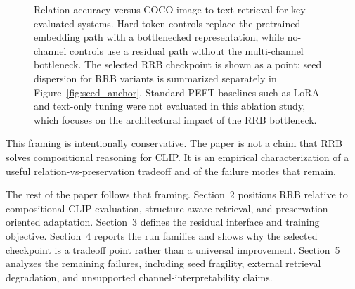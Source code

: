 \begin{figure}[t]
    \centering
    
    \caption{Relation accuracy versus COCO image-to-text retrieval for key evaluated systems. Hard-token controls replace the pretrained embedding path with a bottlenecked representation, while no-channel controls use a residual path without the multi-channel bottleneck. The selected RRB checkpoint is shown as a point; seed dispersion for RRB variants is summarized separately in Figure~\ref{fig:seed_anchor}. Standard PEFT baselines such as LoRA and text-only tuning were not evaluated in this ablation study, which focuses on the architectural impact of the RRB bottleneck.}
    \label{fig:relation_coco}
\end{figure}

This framing is intentionally conservative. The paper is not a claim that RRB solves compositional reasoning for CLIP. It is an empirical characterization of a useful relation-vs-preservation tradeoff and of the failure modes that remain.

The rest of the paper follows that framing. Section~2 positions RRB relative to compositional CLIP evaluation, structure-aware retrieval, and preservation-oriented adaptation. Section~3 defines the residual interface and training objective. Section~4 reports the run families and shows why the selected checkpoint is a tradeoff point rather than a universal improvement. Section~5 analyzes the remaining failures, including seed fragility, external retrieval degradation, and unsupported channel-interpretability claims.
